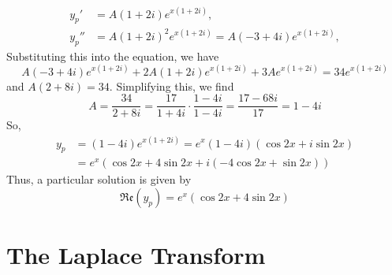\documentclass{article}
\begin{document}
\begin{enumerate}
\begin{align*}
        y_p'&=A(1+2i)e^{x(1+2i)}, \\
        y_p''&=A(1+2i)^2e^{x(1+2i)}=A(-3+4i)e^{x(1+2i)},
    \end{align*}
    Substituting this into the equation, we have
    \begin{equation*}
        A(-3+4i)e^{x(1+2i)}+2A(1+2i)e^{x(1+2i)}+3Ae^{x(1+2i)}=34e^{x(1+2i)}
    \end{equation*}
    and $A(2+8i)=34$. Simplifying this, we find
    \begin{equation}
        A=\frac{34}{2+8i}=\frac{17}{1+4i}\cdot\frac{1-4i}{1-4i}=\frac{17-68i}{17}=1-4i
    \end{equation}
    So,
    \begin{align*}
        y_p&=(1-4i)e^{x(1+2i)}=e^x(1-4i)(\cos 2x+i\sin 2x) \\
        &=e^x(\cos 2x+4\sin 2x+i(-4\cos 2x+\sin 2x))
    \end{align*}
    Thus, a particular solution is given by
    \begin{equation*}
        \mathfrak{Re}(y_p)=e^x(\cos 2x+4\sin 2x)
    \end{equation*}
\end{enumerate}
\newpage
\section{The Laplace Transform}
\end{document}
